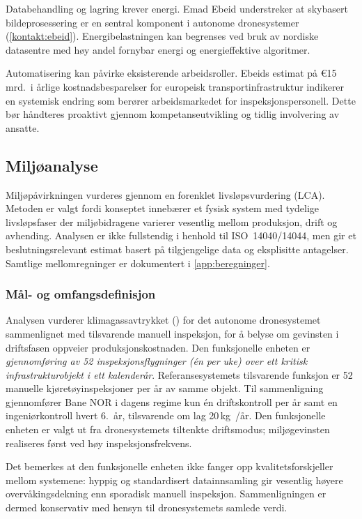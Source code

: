 Databehandling og lagring krever energi. Emad Ebeid understreker at skybasert bildeprosessering er en sentral komponent i autonome dronesystemer (\cref{kontakt:ebeid}). Energibelastningen kan begrenses ved bruk av nordiske datasentre med høy andel fornybar energi og energieffektive algoritmer.

Automatisering kan påvirke eksisterende arbeidsroller. Ebeids estimat på €15 mrd.\ i årlige kostnadsbesparelser for europeisk transportinfrastruktur indikerer en systemisk endring som berører arbeidsmarkedet for inspeksjonspersonell. Dette bør håndteres proaktivt gjennom kompetanseutvikling og tidlig involvering av ansatte.

\subsection{Miljøanalyse}
\label{subsec:lca}

Miljøpåvirkningen vurderes gjennom en forenklet livsløpsvurdering (LCA). Metoden er valgt fordi konseptet innebærer et fysisk system med tydelige livsløpsfaser der miljøbidragene varierer vesentlig mellom produksjon, drift og avhending. Analysen er ikke fullstendig i henhold til ISO~14040/14044, men gir et beslutningsrelevant estimat basert på tilgjengelige data og eksplisitte antagelser. Samtlige mellomregninger er dokumentert i \cref{app:beregninger}.

\subsubsection{Mål- og omfangsdefinisjon}

Analysen vurderer klimagassavtrykket () for det autonome dronesystemet sammenlignet med tilsvarende manuell inspeksjon, for å belyse om gevinsten i driftsfasen oppveier produksjonskostnaden. Den funksjonelle enheten er \textit{gjennomføring av 52 inspeksjonsflygninger (én per uke) over ett kritisk infrastrukturobjekt i ett kalenderår}. Referansesystemets tilsvarende funksjon er 52 manuelle kjøretøyinspeksjoner per år av samme objekt. Til sammenligning gjennomfører Bane NOR i dagens regime kun én driftskontroll per år samt en ingeniørkontroll hvert 6.\ år, tilsvarende om lag 20\,kg~/år. Den funksjonelle enheten er valgt ut fra dronesystemets tiltenkte driftsmodus; miljøgevinsten realiseres først ved høy inspeksjonsfrekvens.

Det bemerkes at den funksjonelle enheten ikke fanger opp kvalitetsforskjeller mellom systemene: hyppig og standardisert datainnsamling gir vesentlig høyere overvåkingsdekning enn sporadisk manuell inspeksjon. Sammenligningen er dermed konservativ med hensyn til dronesystemets samlede verdi.

